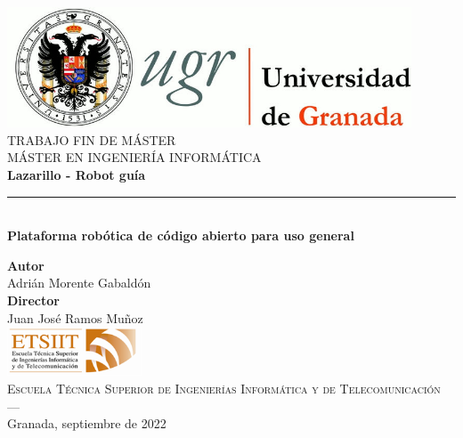 \begin{titlepage}

\newlength{\centeroffset}
\setlength{\centeroffset}{-0.5\oddsidemargin}
\addtolength{\centeroffset}{0.5\evensidemargin}
\thispagestyle{empty}

\noindent\hspace*{\centeroffset}\begin{minipage}{\textwidth}

\centering
\includegraphics[width=0.9\textwidth]{imagenes/logo_ugr.jpg}\\[1.4cm]

\textsc{\Large TRABAJO FIN DE MÁSTER\\[0.2cm]}
\textsc{MÁSTER EN INGENIERÍA INFORMÁTICA}\\[1cm]
% 
{\Huge\bfseries Lazarillo - Robot guía\\
}
\noindent\rule[-1ex]{\textwidth}{3pt}\\[3.5ex]
{\large\bfseries Plataforma robótica de código abierto para uso general}
\end{minipage}

\vspace{2.5cm}
\noindent\hspace*{\centeroffset}\begin{minipage}{\textwidth}
\centering

\textbf{Autor}\\ {Adrián Morente Gabaldón}\\[2.5ex]
\textbf{Director}\\
{Juan José Ramos Muñoz}\\[2cm]
\includegraphics[width=0.3\textwidth]{imagenes/etsiit_logo.png}\\[0.1cm]
\textsc{Escuela Técnica Superior de Ingenierías Informática y de Telecomunicación}\\
\textsc{---}\\
Granada, septiembre de 2022
\end{minipage}
\end{titlepage}
